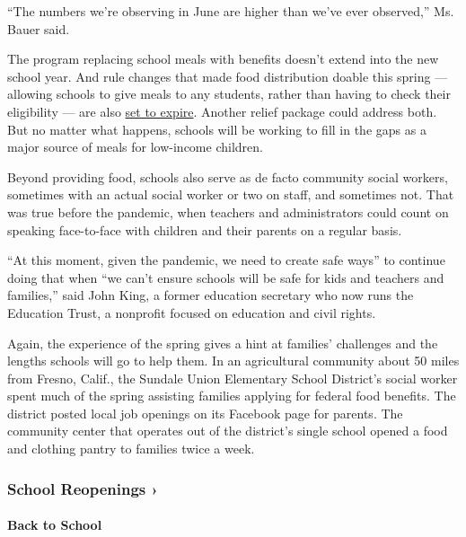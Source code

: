 ``The numbers we're observing in June are higher than we've ever
observed,'' Ms. Bauer said.

The program replacing school meals with benefits doesn't extend into the
new school year. And rule changes that made food distribution doable
this spring --- allowing schools to give meals to any students, rather
than having to check their eligibility --- are also
\href{https://www.politico.com/news/2020/07/20/millions-of-kids-may-lose-out-on-free-meals-as-they-return-to-school-374587}{set
to expire}. Another relief package could address both. But no matter
what happens, schools will be working to fill in the gaps as a major
source of meals for low-income children.

Beyond providing food, schools also serve as de facto community social
workers, sometimes with an actual social worker or two on staff, and
sometimes not. That was true before the pandemic, when teachers and
administrators could count on speaking face-to-face with children and
their parents on a regular basis.

``At this moment, given the pandemic, we need to create safe ways'' to
continue doing that when ``we can't ensure schools will be safe for kids
and teachers and families,'' said John King, a former education
secretary who now runs the Education Trust, a nonprofit focused on
education and civil rights.

Again, the experience of the spring gives a hint at families' challenges
and the lengths schools will go to help them. In an agricultural
community about 50 miles from Fresno, Calif., the Sundale Union
Elementary School District's social worker spent much of the spring
assisting families applying for federal food benefits. The district
posted local job openings on its Facebook page for parents. The
community center that operates out of the district's single school
opened a food and clothing pantry to families twice a week.

\href{https://www.nytimes3xbfgragh.onion/spotlight/schools-reopening?action=click\&pgtype=Article\&state=default\&region=MAIN_CONTENT_3\&context=storylines_keepup}{}

\hypertarget{school-reopenings-}{%
\subsubsection{School Reopenings ›}\label{school-reopenings-}}

\hypertarget{back-to-school}{%
\paragraph{Back to School}\label{back-to-school}}

